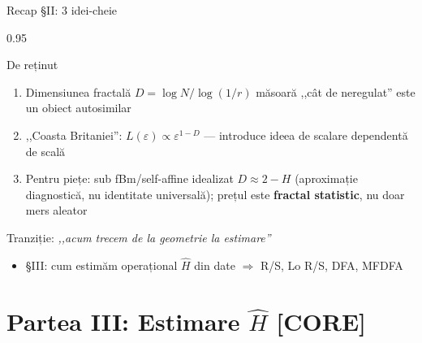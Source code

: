 \documentclass[9pt, aspectratio=169, t]{beamer}
\begin{document}
\begin{frame}[shrink=15]{Recap §II: 3 idei-cheie}
\begin{cminipage}{0.95\textwidth}
\begin{block}{De reținut}
\begin{enumerate}\setlength{\itemsep}{4pt}
    \item Dimensiunea fractală $D=\log N/\log(1/r)$ măsoară ,,cât de neregulat'' este un obiect autosimilar
    \item ,,Coasta Britaniei'': $L(\varepsilon)\propto\varepsilon^{1-D}$ --- introduce ideea de scalare dependentă de scală
    \item Pentru piețe: sub fBm/self-affine idealizat $D\approx 2-H$ (aproximație diagnostică, nu identitate universală); prețul este \textbf{fractal statistic}, nu doar mers aleator
\end{enumerate}
\end{block}
\begin{exampleblock}{Tranziție: \textit{,,acum trecem de la geometrie la estimare''}}
\begin{itemize}\setlength{\itemsep}{0pt}
    \item §III: cum estimăm operațional $\hat H$ din date $\Rightarrow$ R/S, Lo R/S, DFA, MFDFA
\end{itemize}
\end{exampleblock}
\end{cminipage}
\end{frame}

\section{Partea III: Estimare $\hat H$ [CORE]}
\end{document}
